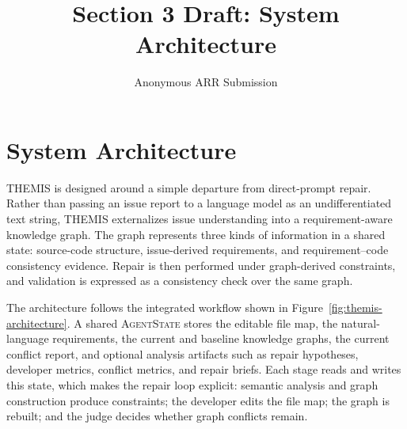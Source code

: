 \documentclass[11pt]{article}
\title{Section 3 Draft: System Architecture}
\author{Anonymous ARR Submission}
\begin{document}
\maketitle

\section{System Architecture}
\label{sec:system-architecture}

THEMIS is designed around a simple departure from direct-prompt repair.  Rather than passing an issue report to a language model as an undifferentiated text string, THEMIS externalizes issue understanding into a requirement-aware knowledge graph.  The graph represents three kinds of information in a shared state: source-code structure, issue-derived requirements, and requirement--code consistency evidence.  Repair is then performed under graph-derived constraints, and validation is expressed as a consistency check over the same graph.

The architecture follows the integrated workflow shown in Figure~\ref{fig:themis-architecture}.  A shared \textsc{AgentState} stores the editable file map, the natural-language requirements, the current and baseline knowledge graphs, the current conflict report, and optional analysis artifacts such as repair hypotheses, developer metrics, conflict metrics, and repair briefs.  Each stage reads and writes this state, which makes the repair loop explicit: semantic analysis and graph construction produce constraints; the developer edits the file map; the graph is rebuilt; and the judge decides whether graph conflicts remain.
\end{document}
